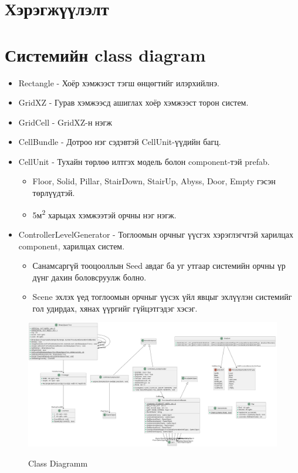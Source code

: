 \section{Хэрэгжүүлэлт }
\section{Системийн class diagram}
\begin{itemize}
	\item Rectangle - Хоёр хэмжээст тэгш өнцөгтийг илэрхийлнэ.
	\item GridXZ - Гурав хэмжээсд ашиглах хоёр хэмжээст торон систем.
	\item GridCell - GridXZ-н нэгж
	\item CellBundle - Дотроо нэг сэдэвтэй CellUnit-үүдийн багц.
	\item CellUnit - Тухайн төрлөө илтгэх модель болон component-тэй prefab.
	      \begin{itemize}
		      \item Floor, Solid, Pillar, StairDown, StairUp, Abyss, Door, Empty гэсэн төрлүүдтэй.
		      \item 5м\textsuperscript*{2} харьцах хэмжээтэй орчны нэг нэгж.
	      \end{itemize}

	\item ControllerLevelGenerator - Тоглоомын орчныг үүсгэх хэрэглэгчтэй харилцах component, харилцах систем.
	      \begin{itemize}
		      \item Санамсаргүй тооцооллын Seed авдаг ба уг утгаар системийн орчны үр дүнг дахин боловсруулж болно.
		      \item Scene эхлэх үед тоглоомын орчныг үүсэх үйл явцыг эхлүүлэн системийг гол удирдах, хянах үүргийг гүйцэтгэдэг хэсэг.
	      \end{itemize}
\end{itemize}
\begin{figure}[H]
	\centering
	\caption{Class Diagramm}
	\includegraphics[angle=90, height=\textheight-1cm]{./images/ClassDiagramm.png}
	\label{fig:ClassDiagramm}
\end{figure}

